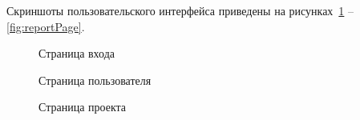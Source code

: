 	Скриншоты пользовательского интерфейса приведены на рисунках~\ref{fig:loginPage} -- \ref{fig:reportPage}.
	
	\begin{figure}[h]
		\caption{Страница входа}
		\label{fig:loginPage}
	\end{figure}
	\begin{figure}[h]
		\caption{Страница пользователя}
		\label{fig:userPage}
	\end{figure}
	\begin{figure}[h]
		\caption{Страница проекта}
		\label{fig:projectPage}
	\end{figure}
